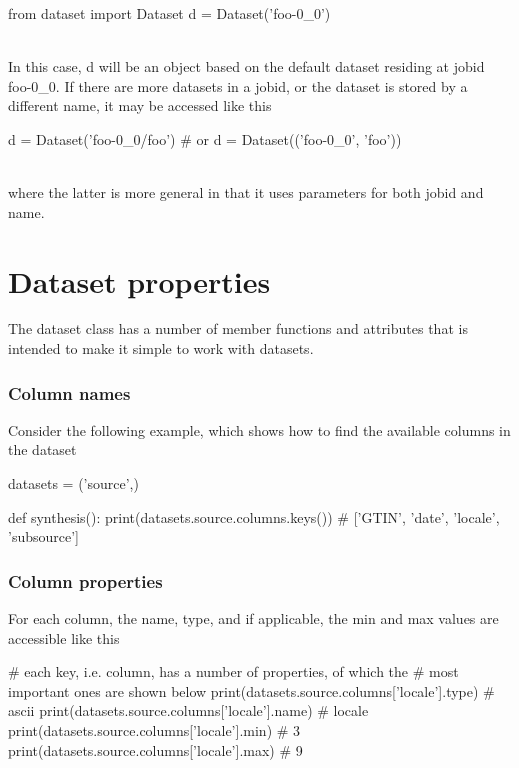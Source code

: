 \begin{python}
from dataset import Dataset
d = Dataset('foo-0_0')
\end{python}
\\
In this case, d will be an object based on the default dataset
residing at jobid foo-0\_0.  If there are more datasets in a jobid, or
the dataset is stored by a different name, it may be accessed like
this

\begin{python}
d = Dataset('foo-0_0/foo')
# or
d = Dataset(('foo-0_0', 'foo'))
\end{python}
\\
where the latter is more general in that it uses parameters for both
jobid and name.



\newpage
\section{Dataset properties}

The dataset class has a number of member functions and attributes that
is intended to make it simple to work with datasets.



\subsubsection{Column names}

Consider the
following example, which shows how to find the available columns in
the dataset

\begin{python}
datasets = ('source',)

def synthesis():
  print(datasets.source.columns.keys())
  # ['GTIN', 'date', 'locale', 'subsource']
\end{python}



\subsubsection{Column properties}

For each column, the name, type, and if applicable, the min and max
values are accessible like this

\begin{python}
# each key, i.e. column, has a number of properties, of which the
# most important ones are shown below
print(datasets.source.columns['locale'].type)
# ascii
print(datasets.source.columns['locale'].name)
# locale
print(datasets.source.columns['locale'].min)
# 3
print(datasets.source.columns['locale'].max)
# 9
\end{python}

